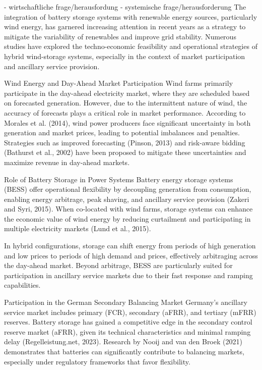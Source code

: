 - wirtschaftliche frage/herausfordung
- systemische frage/herausforderung
The integration of battery storage systems with renewable energy sources, particularly wind energy,
has garnered increasing attention in recent years as a strategy to mitigate the variability of renewables
and improve grid stability. Numerous studies have explored the techno-economic feasibility and operational
strategies of hybrid wind-storage systems, especially in the context of market participation and ancillary
service provision.

Wind Energy and Day-Ahead Market Participation
Wind farms primarily participate in the day-ahead electricity market, where they are scheduled based on
forecasted generation. However, due to the intermittent nature of wind, the accuracy of forecasts plays
a critical role in market performance. According to Morales et al. (2014), wind power producers face
significant uncertainty in both generation and market prices, leading to potential imbalances and penalties.
Strategies such as improved forecasting (Pinson, 2013) and risk-aware bidding (Bathurst et al., 2002)
have been proposed to mitigate these uncertainties and maximize revenue in day-ahead markets.

Role of Battery Storage in Power Systems
Battery energy storage systems (BESS) offer operational flexibility by decoupling generation from consumption,
enabling energy arbitrage, peak shaving, and ancillary service provision (Zakeri and Syri, 2015). When co-located
with wind farms, storage systems can enhance the economic value of wind energy by reducing curtailment and
participating in multiple electricity markets (Lund et al., 2015).

In hybrid configurations, storage can shift energy from periods of high generation and low prices to periods of
high demand and prices, effectively arbitraging across the day-ahead market. Beyond arbitrage, BESS are particularly
suited for participation in ancillary service markets due to their fast response and ramping capabilities.

Participation in the German Secondary Balancing Market
Germany’s ancillary service market includes primary (FCR), secondary (aFRR), and tertiary (mFRR) reserves.
Battery storage has gained a competitive edge in the secondary control reserve market (aFRR), given its
technical characteristics and minimal ramping delay (Regelleistung.net, 2023). Research by Nooij and van den Broek
(2021) demonstrates that batteries can significantly contribute to balancing markets, especially under
regulatory frameworks that favor flexibility.

